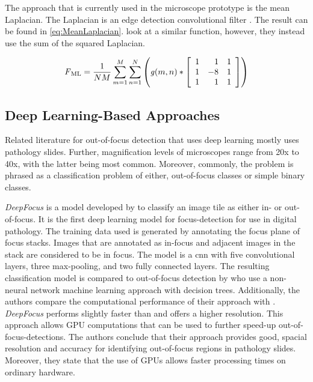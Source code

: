 The approach that is currently used in the microscope prototype is the mean Laplacian. The Laplacian is an edge detection convolutional filter \cite{vikrammutneja2015methods}. The result can be found in \autoref{eq:MeanLaplacian}. \textcite{redondo2012autofocus} look at a similar function, however, they instead use the sum of the squared Laplacian.

\begin{equation}
    \label{eq:MeanLaplacian}
    \operatorname{\mathit{F}}_{\mathrm{ML}}= \frac{1}{NM} \sum_{m=1}^{M}\sum_{n=1}^{N} 
    \left( {
        \operatorname{\mathit{g}}(m,n) *
        \left[ {
            \begin{array}{rrr}
                1 & 1 & 1 \\
                1 & -8 & 1 \\
                1 & 1 & 1 
            \end{array} 
        } \right]
    } \right)
\end{equation}

\subsection{Deep Learning-Based Approaches}
\label{sec:Foundations:RelatedWorks:DeepLearning}

Related literature for out-of-focus detection that uses deep learning mostly uses pathology slides. Further, magnification levels of microscopes range from 20x to 40x, with the latter being most common. Moreover, commonly, the problem is phrased as a classification problem of either, out-of-focus classes or simple binary classes.

\emph{DeepFocus} is a model developed by \textcite{senaras2018deepfocus} to classify an image tile as either in- or out-of-focus. It is the first deep learning model for focus-detection for use in digital pathology. The training data used is generated by annotating the focus plane of focus stacks. Images that are annotated as in-focus and adjacent images in the stack are considered to be in focus. The model is a \ac{cnn} with five convolutional layers, three max-pooling, and two fully connected layers. The resulting classification model is compared to out-of-focus detection by \textcite{moleslopez2013automated} who use a non-neural network machine learning approach with decision trees.
Additionally, the authors compare the computational performance of their approach with \textcite{moleslopez2013automated}. \emph{DeepFocus} performs slightly faster than \textcite{moleslopez2013automated} and offers a higher resolution. This approach allows GPU computations that can be used to further speed-up out-of-focus-detections.
The authors conclude that their approach provides good, spacial resolution and accuracy for identifying out-of-focus regions in pathology slides. Moreover, they state that the use of GPUs allows faster processing times on ordinary hardware.

